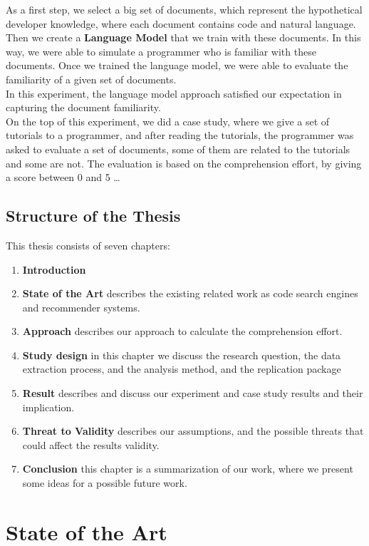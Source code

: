 \documentclass[mscthesis,20pt]{usiinfthesis}
\begin{document}
	 As a first step, we select a big set of documents, which represent the hypothetical developer knowledge, where each document contains code and natural language. Then we create a \textbf{ Language Model} that we train with these documents. In this way, we were able to simulate a programmer who is familiar with these documents. Once we trained the language model, we were able to evaluate the familiarity of a given set of documents.\\ In this experiment, the language model approach satisfied our expectation in capturing the document familiarity.\\

	 On the top of this experiment, we did a case study, where we give a set of tutorials to a programmer, and after reading the tutorials, the programmer was asked to evaluate a set of documents, some of them are related to the tutorials and some are not. The evaluation is based on the comprehension effort, by giving a score between 0 and 5 \dots 


	\section{Structure of the Thesis}
	This thesis consists of seven chapters: 
	\begin{enumerate}
	
		\item \textbf{Introduction}
		\item \textbf{State of the Art} describes the existing related work as code search engines and recommender systems.
		\item \textbf{Approach} describes our approach to calculate the comprehension effort.
		\item \textbf{Study design} in this chapter we discuss the research question, the data extraction process, and the analysis method, and the replication package 
		\item \textbf{Result} describes and discuss our experiment and case study results and their implication.
		\item \textbf{Threat to Validity} describes our assumptions, and the possible threats that could affect the results validity.
		\item \textbf{Conclusion} this chapter is a summarization of our work, where we present some ideas for a possible future work.
	\end{enumerate}
\chapter{State of the Art}
\end{document}
